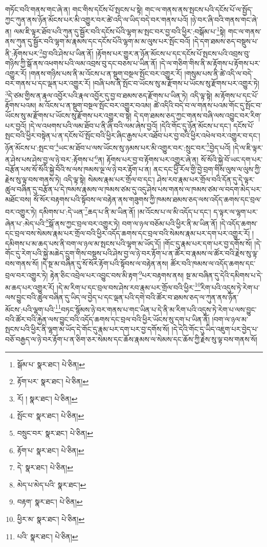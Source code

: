 གཏོང་བའི་གནས་གང་ཞེ་ན། གང་གིས་དངོས་པོ་སྤངས་པ་སྟེ། གང་ལ་གནས་ནས་སྤངས་པའི་དངོས་པོ་ལ་སྤྱོད་ཀྱང་ཀུན་ནས་ཉོན་མོངས་པར་མི་འགྱུར་བར་ཚེ་འདི་ལ་ཡིད་བདེ་བར་གནས་པའོ། །ཉེ་བར་ཞི་བའི་གནས་གང་ཞེ་ན། ལམ་ཇི་ལྟར་ཐོབ་པའི་ཀུན་དུ་སྦྱོར་བའི་དངོས་པོའི་ལྷག་མ་སྤང་བར་བྱ་བའི་ཕྱིར་:བསྒོམ་པ་\footnote{སྒོམ་པ་  སྣར་ཐང་།  པེ་ཅིན། }སྟེ། གང་ལ་གནས་ནས་ཀུན་དུ་སྦྱོར་བའི་ལྷག་མ་རྣམས་དང་དངོས་པོའི་ལྷག་མ་མ་ལུས་པར་སྤོང་བའོ། །དེ་དག་ཐམས་ཅད་བསྡུས་པ་ནི་:རྟོགས་པར་\footnote{རྟོག་པར་  སྣར་ཐང་།  པེ་ཅིན། }བྱ་བའི་ཤེས་པ་ཡིན་ནོ། །རྟོགས་པར་གྱུར་ན་ཉོན་མོངས་པ་དང་དངོས་པོ་སྤངས་པའི་འབྲས་བུ་གཉིས་ཀྱི་སྒོ་ནས་འཕགས་པའི་ལམ་འབྲས་བུ་དང་བཅས་པ་ཡིན་ནོ། །དེ་ལ་གཅིག་གིས་ནི་མ་རྟོགས་པ་རྟོགས་པར་འགྱུར་རོ། །གནས་གཉིས་པས་ནི་མ་འོངས་པ་ན་སྡུག་བསྔལ་སྤོང་བར་འགྱུར་རོ། །གསུམ་པས་ནི་ཚེ་འདི་ལ་བདེ་བར་གནས་པ་དང་ལྡན་པར་འགྱུར་རོ། །བཞི་པས་ནི་སྤོང་བ་ཡོངས་སུ་མ་རྫོགས་པ་ཡོངས་སུ་རྫོགས་པར་འགྱུར་ཏེ། \footnote{རོ། །   སྣར་ཐང་།  པེ་ཅིན། }དེ་ཙམ་གྱིས་ན་རྣལ་འབྱོར་པའི་རྣལ་འབྱོར་དུ་བྱ་བ་ཐམས་ཅད་རྫོགས་པ་ཡིན་ཏེ། འདི་ལྟ་སྟེ། མ་རྟོགས་པ་དང་པོ་རྟོགས་པའམ། མ་འོངས་པ་ན་སྡུག་བསྔལ་སྤོང་བར་འགྱུར་བའམ། ཚེ་འདིའི་བདེ་བ་ལ་གནས་པའམ་གོང་དུ་སྤོང་བ་ཡོངས་སུ་མ་རྫོགས་པ་ཡོངས་སུ་རྫོགས་པར་འགྱུར་བ་སྟེ། དེ་དག་ཐམས་ཅད་ཀྱང་གནས་བཞི་ལས་འབྱུང་བར་རིག་པར་བྱའོ། །དེ་ལ་འཕགས་པའི་ལམ་ཐོབ་པ་ནི་ཞི་བའི་ལམ་ཞེས་བྱའོ། །དེའི་གོང་དུ་ཉོན་མོངས་པ་དང་། དངོས་པོ་སྤང་བའི་ཕྱིར་བསྟེན་པ་ན་དངོས་པོ་སྤོང་བའི་ཕྱིར་ཞིང་རྒྱས་པར་འཐོབ་པར་བྱ་བའི་ཕྱིར་འཕེལ་བར་འགྱུར་བ་དང་། ཉོན་མོངས་པ་:སྤང་བ་\footnote{སྤོང་བ་  སྣར་ཐང་།  པེ་ཅིན། }ཡང་མ་ཐོབ་པ་ལས་ཡོངས་སུ་ཉམས་པར་མི་འགྱུར་བར་:སྲུང་བར་\footnote{བསྲུང་བར་  སྣར་ཐང་།  པེ་ཅིན། }བྱེད་པའོ། །དེ་ལ་ཇི་ལྟར་ན་ཤེས་པས་ཤེས་བྱ་ལ་ཉེ་བར་:རྟོགས་པ་\footnote{རྟོག་པ་  སྣར་ཐང་།  པེ་ཅིན། }ན། རྟོགས་པར་བྱ་བ་རྟོགས་པར་འགྱུར་ཞེ་ན། སོ་སོའི་སྐྱེ་བོ་ཡང་དག་པར་བརྩོན་པས་སོ་སོའི་སྐྱེ་བོའི་ས་ལས་ཁམས་ལྔ་ལ་ཉེ་བར་རྟོག་པ་ན། ནང་དང་ཕྱི་རོལ་གྱི་བྱེ་བྲག་གིས་ལུས་ལ་ལུས་ཀྱི་རྗེས་སུ་ལྟ་བས་གནས་ཏེ། འདི་ལྟ་སྟེ། སེམས་རྣམ་པར་གྲོལ་བ་དང་། ཤེས་རབ་རྣམ་པར་གྲོལ་བའི་དོན་དུ་དེ་ལྟར་ཚུལ་བཞིན་དུ་བརྩོན་པ་དེ་ཁམས་རྣམས་ལ་ཁམས་ཙམ་དུ་འདུ་ཤེས་པས་གནས་ལ་ཁམས་ཙམ་ལ་བདག་མེད་པར་མཐོང་བས། སོ་སོར་བརྟགས་པའི་སྟོབས་ལ་བརྟེན་ནས་གཟུགས་ཀྱི་ཁམས་ཐམས་ཅད་ལས་འདོད་ཆགས་དང་བྲལ་བར་འགྱུར་ཏེ། དམིགས་པ་:དེ་ཡན་\footnote{དེ་  སྣར་ཐང་།  པེ་ཅིན། }ཆད་པ་ནི་མ་ཡིན་ནོ། །མ་འོངས་པ་ལ་མི་འདོད་པ་དང་། ད་ལྟར་ལ་ལྷག་པར་ཞེན་པ་:མེད་པའི་\footnote{མེད་པ་མེད་པའི་  སྣར་ཐང་། }སྒོ་ནས་ཀྱང་བྲལ་བར་འགྱུར་ཏེ། བག་ལ་ཉལ་བཅོམ་པའི་ཕྱིར་ནི་མ་ཡིན་ནོ། །དེ་འདོད་ཆགས་དང་བྲལ་བས་སེམས་རྣམ་པར་གྲོལ་བའི་ཕྱིར་འདོད་ཆགས་དང་བྲལ་བའི་སེམས་རྣམ་པར་དག་པར་འགྱུར་རོ། །དམིགས་པ་མ་ཆད་པས་ནི་བག་ལ་ཉལ་མ་སྤངས་པའི་ལྷག་མ་ཡོད་དོ། །གོང་དུ་རྣམ་པར་དག་པར་བྱ་དགོས་སོ། །དེ་གོང་དུ་རེག་པའི་སྐྱེ་མཆེད་དྲུག་གིས་བསྡུས་པའི་ཤེས་བྱ་ལ་ཉེ་བར་རྟོག་པ་ན་ཚོར་བ་རྣམས་ལ་ཚོར་བའི་རྗེས་སུ་ལྟ་བས་གནས་སོ། །དེ་སྔ་མ་བཞིན་དུ་སོ་སོར་རྟོག་པའི་སྟོབས་ལ་བརྟེན་ནས། ཚོར་བའི་ཁམས་ལ་འདོད་ཆགས་དང་བྲལ་བར་འགྱུར་ཏེ། རྟེན་ཅིང་འབྲེལ་པར་འབྱུང་བས་མི་རྟག་\footnote{བརྟག་  སྣར་ཐང་།  པེ་ཅིན། }པར་བརྟགས་ནས། སྔ་མ་བཞིན་དུ་དེའི་དམིགས་པ་དེ་མ་ཆད་པར་འགྱུར་རོ། །དེ་མ་རིག་པ་དང་བྲལ་བས་ཤེས་རབ་རྣམ་པར་གྲོལ་བའི་ཕྱིར་\footnote{ཕྱིར་མ་  སྣར་ཐང་།  པེ་ཅིན། }རིག་པའི་འདུས་ཏེ་རེག་པ་ལས་བྱུང་བའི་ཚུལ་བཞིན་དུ་ཡིད་ལ་བྱེད་པ་དང་ལྡན་པའི་དགེ་བའི་ཚོར་བ་ཐམས་ཅད་ལ་ཀུན་ནས་ཉོན་མོངས་:པའི་ལྷག་པའི་\footnote{པའི་  སྣར་ཐང་།  པེ་ཅིན། }བཏང་སྙོམས་ཉེ་བར་གནས་པ་གང་ཡིན་པ་དེ་ནི་མ་རིག་པའི་འདུས་ཏེ་རེག་པ་ལས་བྱུང་བའི་ཚོར་བའི་རྐྱེན་ལས་བྱུང་བའི་འདོད་ཆགས་དང་བྲལ་བའི་ཕྱིར་ཡོངས་སུ་དག་པ་ཡིན་ནོ། །བག་ལ་ཉལ་མ་སྤངས་པའི་ཕྱིར་ནི་ལྷག་མ་ཡོད་དེ་གོང་དུ་རྣམ་པར་དག་པར་བྱ་དགོས་སོ། །དེ་དེའི་གོང་དུ་ཡིད་འཇུག་པར་བྱེད་པ་བཅོ་བརྒྱད་ལ་ཉེ་བར་རྟོག་པ་ན་ཅིག་ཅར་སེམས་དང་ཆོས་རྣམས་ལ་སེམས་དང་ཆོས་ཀྱི་རྗེས་སུ་ལྟ་བས་གནས་སོ། 